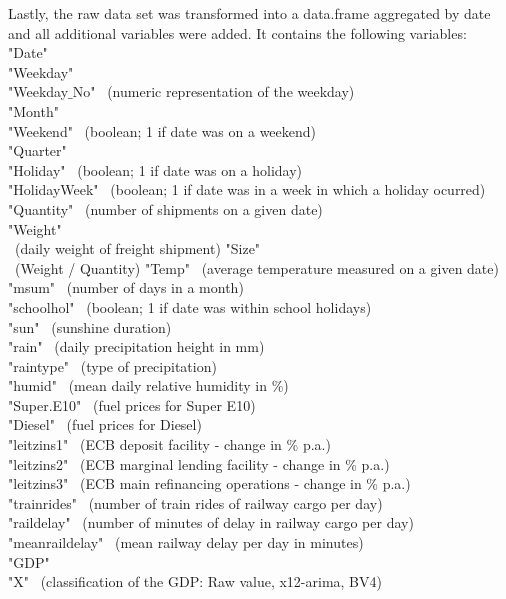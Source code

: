 \documentclass[a4paper, 11pt]{article}
\begin{document}
Lastly, the raw data set was transformed into a data.frame aggregated by date and all additional variables were added. It contains the following variables: \\
"Date"\\
"Weekday"\\ 
"Weekday$\_$No" \ (numeric representation of the weekday)\\
"Month"\\
"Weekend" \ (boolean; 1 if date was on a weekend)\\
"Quarter"\\
"Holiday" \ (boolean; 1 if date was on a holiday)\\
"HolidayWeek" \ (boolean; 1 if date was in a week in which a holiday ocurred) \\ "Quantity" \ (number of shipments on a given date)\\ 
"Weight"\\ \ (daily weight of freight shipment)
"Size" \\ \ (Weight / Quantity)
"Temp"  \ (average temperature measured on a given date)\\
"msum" \ (number of days in a month) \\
"schoolhol"  \ (boolean; 1 if date was within school holidays)\\ 
"sun" \ (sunshine duration) \\
"rain" \ (daily precipitation height in mm) \\
"raintype" \ (type of precipitation) \\
"humid" \ (mean daily relative humidity in \%) \\
"Super.E10" \ (fuel prices for Super E10) \\
"Diesel"  \ (fuel prices for Diesel)  \\
"leitzins1" \ (ECB deposit facility - change in \% p.a.) \\
"leitzins2" \ (ECB marginal lending facility - change in \% p.a.) \\
"leitzins3" \ (ECB main refinancing operations - change in \% p.a.) \\
"trainrides" \ (number of train rides of railway cargo per day) \\
"raildelay" \ (number of minutes of delay in railway cargo per day) \\
"meanraildelay" \ (mean railway delay per day in minutes) \\
"GDP" \\
"X" \ (classification of the GDP: Raw value, x12-arima, BV4) \\
\end{document}
